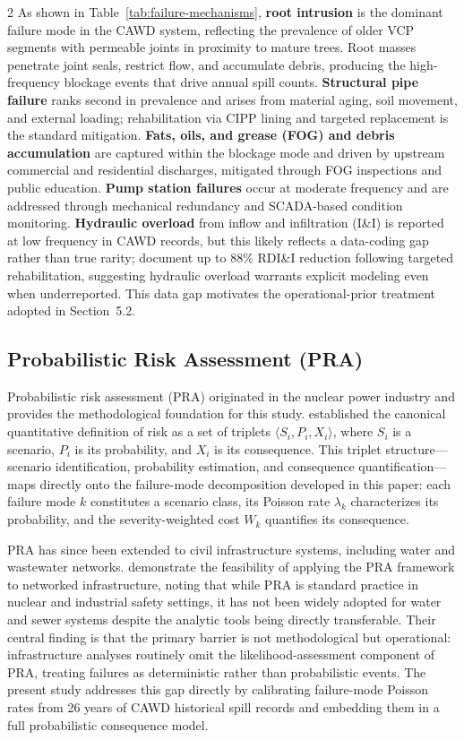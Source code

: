 \documentclass[10pt]{article}
\begin{document}
\begin{multicols}{2}
As shown in Table~\ref{tab:failure-mechanisms}, \textbf{root intrusion}
is the dominant failure mode in the CAWD system, reflecting the prevalence
of older VCP segments with permeable joints in proximity to mature trees.
Root masses penetrate joint seals, restrict flow, and accumulate debris,
producing the high-frequency blockage events that drive annual spill counts.
\textbf{Structural pipe failure} ranks second in prevalence and arises from
material aging, soil movement, and external loading; rehabilitation via
CIPP lining and targeted replacement is the standard mitigation.
\textbf{Fats, oils, and grease (FOG) and debris accumulation} are captured
within the blockage mode and driven by upstream commercial and residential
discharges, mitigated through FOG inspections and public education.
\textbf{Pump station failures} occur at moderate frequency and are addressed
through mechanical redundancy and SCADA-based condition monitoring.
\textbf{Hydraulic overload} from inflow and infiltration (I\&I) is reported
at low frequency in CAWD records, but this likely reflects a data-coding
gap rather than true rarity; \citet{brandstetter1996} document up to 88\%
RDI\&I reduction following targeted rehabilitation, suggesting hydraulic
overload warrants explicit modeling even when underreported. This data gap
motivates the operational-prior treatment adopted in Section~5.2.
 
\subsection{Probabilistic Risk Assessment (PRA)}
 
Probabilistic risk assessment (PRA) originated in the nuclear power
industry and provides the methodological foundation for this study.
\citet{kaplan1981} established the canonical quantitative definition of
risk as a set of triplets $\langle S_i, P_i, X_i \rangle$, where $S_i$
is a scenario, $P_i$ is its probability, and $X_i$ is its consequence.
This triplet structure---scenario identification, probability estimation,
and consequence quantification---maps directly onto the failure-mode
decomposition developed in this paper: each failure mode $k$ constitutes
a scenario class, its Poisson rate $\lambda_k$ characterizes its
probability, and the severity-weighted cost $W_k$ quantifies its
consequence.
 
PRA has since been extended to civil infrastructure systems, including
water and wastewater networks. \citet{johnson2021} demonstrate the
feasibility of applying the PRA framework to networked infrastructure,
noting that while PRA is standard practice in nuclear and industrial safety
settings, it has not been widely adopted for water and sewer systems despite
the analytic tools being directly transferable. Their central finding is
that the primary barrier is not methodological but operational:
infrastructure analyses routinely omit the likelihood-assessment component
of PRA, treating failures as deterministic rather than probabilistic events.
The present study addresses this gap directly by calibrating failure-mode
Poisson rates from 26 years of CAWD historical spill records and embedding
them in a full probabilistic consequence model.
 

\end{multicols}
\end{document}

